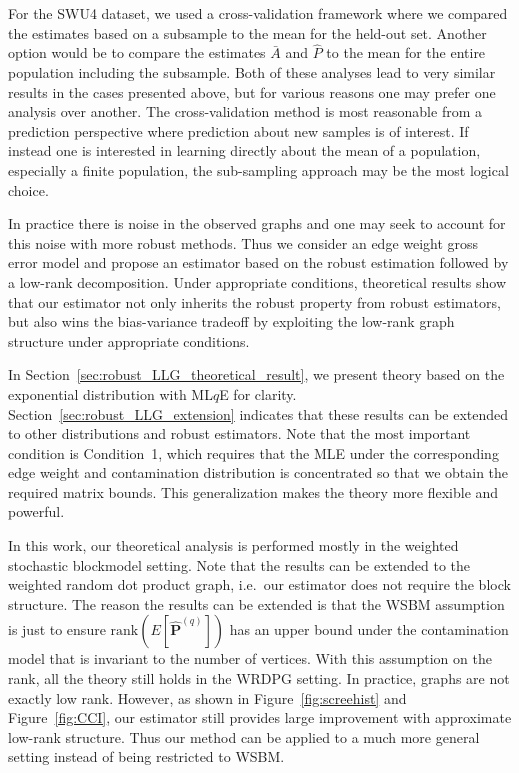 For the SWU4 dataset, we used a cross-validation framework where we compared the estimates based on a subsample to the mean for the held-out set. 
Another option would be to compare the estimates $\bar{A}$ and $\hat{P}$ to the mean for the entire population including the subsample.
Both of these analyses lead to very similar results in the cases presented above, but for various reasons one may prefer one analysis over another.
The cross-validation method is most reasonable from a prediction perspective where prediction about new samples is of interest.
If instead one is interested in learning directly about the mean of a population, especially a finite population, the sub-sampling approach may be the most logical choice.

In practice there is noise in the observed graphs and one may seek to account for this noise with more robust methods. Thus we consider an edge weight gross error model and propose an estimator based on the robust estimation followed by a low-rank decomposition. Under appropriate conditions, theoretical results show that our estimator not only inherits the robust property from robust estimators, but also wins the bias-variance tradeoff by exploiting the low-rank graph structure under appropriate conditions.

In Section~\ref{sec:robust_LLG_theoretical_result}, we present theory based on the exponential distribution with ML$q$E for clarity. Section~\ref{sec:robust_LLG_extension} indicates that these results can be extended to other distributions and robust estimators. Note that the most important condition is Condition~1, which requires that the MLE under the corresponding edge weight and contamination distribution is concentrated so that we obtain the required matrix bounds. This generalization makes the theory more flexible and powerful.

In this work, our theoretical analysis is performed mostly in the weighted stochastic blockmodel setting. Note that the results can be extended to the weighted random dot product graph, i.e.\ our estimator does not require the block structure. The reason the results can be extended is that the WSBM assumption is just to ensure $\mathrm{rank}(E[\hat{\bm{P}}^{(q)}])$ has an upper bound under the contamination model that is invariant to the number of vertices. With this assumption on the rank, all the theory still holds in the WRDPG setting. In practice, graphs are not exactly low rank. However, as shown in Figure~\ref{fig:screehist} and Figure~\ref{fig:CCI}, our estimator still provides large improvement with approximate low-rank structure. Thus our method can be applied to a much more general setting instead of being restricted to WSBM.

